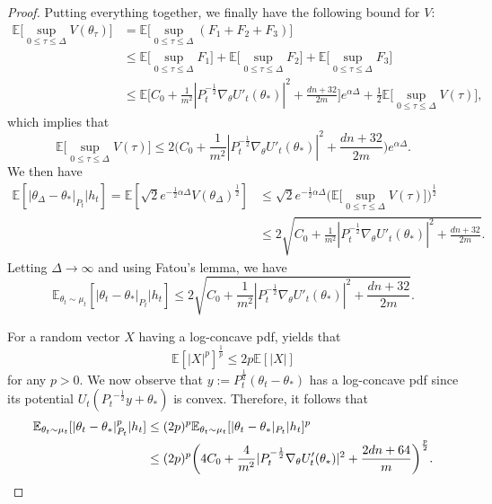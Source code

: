 \documentclass[11pt]{article}
\theoremstyle{plain}
\theoremstyle{definition}
\theoremstyle{remark}
\begin{document}
\begin{proof}
Putting everything together, we finally have the following bound for $V$:
\begin{equation}\label{sup_v}
\begin{split}
\mathbb{E}\bigg[\sup_{0 \leq \tau \leq \Delta} V(\theta_\tau) \bigg]&=\mathbb{E}\bigg[\sup_{0 \leq \tau \leq \Delta}(F_1+F_2+F_3) \bigg]\\
& \leq \mathbb{E}\bigg[\sup_{0 \leq \tau \leq \Delta}F_1\bigg]+\mathbb{E}\bigg[\sup_{0 \leq \tau \leq \Delta}F_2\bigg]+\mathbb{E}\bigg[\sup_{0 \leq \tau \leq \Delta}F_3\bigg]\\
& \leq \mathbb{E}\bigg[C_0+\frac{1}{m^2}|P_t^{-\frac{1}{2}}\nabla_{\theta} U'_t(\theta_*)|^2 + \frac{dn+32}{2m} \bigg]e^{\alpha \Delta} + \frac{1}{2}\mathbb{E}\bigg[\sup_{0 \leq \tau \leq \Delta}V(\tau)\bigg],
\end{split}
\end{equation}
which implies that
\[
\mathbb{E}\bigg[\sup_{0 \leq \tau \leq \Delta} V(\tau) \bigg] \leq
2\bigg(C_0+\frac{1}{m^2}|P_t^{-\frac{1}{2}}\nabla_{\theta} U'_t(\theta_*)|^2 + \frac{dn+32}{2m} \bigg)e^{\alpha \Delta}.
\]
We then have
\begin{equation*}
\begin{split}
    \mathbb{E}[|\theta_{\Delta}-\theta_*|_{P_t}|h_t]  = \mathbb{E}[\sqrt{2}e^{-\frac{1}{2}\alpha \Delta}V(\theta_{\Delta})^{\frac{1}{2}}]
    & \leq \sqrt{2} e^{-\frac{1}{2}\alpha \Delta} \bigg(\mathbb{E}\Big [\sup_{0\leq \tau \leq \Delta}V(\tau) \Big ]\bigg)^{\frac{1}{2}}\\
    & \leq 2\sqrt{C_0+\frac{1}{m^2}|P_t^{-\frac{1}{2}}\nabla_{\theta} U'_t(\theta_*)|^2 + \frac{dn+32}{2m}}.
\end{split}
\end{equation*}
Letting $\Delta \to \infty$ and using Fatou's lemma, we have
\[
\mathbb{E}_{\theta_t \sim \mu_t}[|\theta_t-\theta_*|_{P_t}|h_t] \leq
2\sqrt{C_0+\frac{1}{m^2}|P_t^{-\frac{1}{2}}\nabla_{\theta} U'_t(\theta_*)|^2 + \frac{dn+32}{2m}}.
\]

For a random vector $X$ having a log-concave pdf,
 \cite[Theorem 5.22]{lovasz2003logconcave} yields that
\[
\mathbb{E}[|X|^p]^{\frac{1}{p}} \leq 2p \mathbb{E}[|X|]
\]
for any $p>0$.
We now observe that $y:=P_t^{\frac{1}{2}}(\theta_t-\theta_*)$ has a log-concave pdf since its potential $U_t({P_t}^{-\frac{1}{2}} y +\theta_*)$ is convex. 
Therefore, it follows that
\begin{align}
    \mathbb{E}_{\theta_t \sim \mu_t}[|\theta_t-\theta_*|^p_{P_t}|h_t]&\leq (2p)^p\mathbb{E}_{\theta_t \sim \mu_t}[|\theta_t-\theta_*|_{P_t}|h_t]^p \notag \\
    &\leq (2p)^p\bigg(4C_0+\frac{4}{m^2}|P_t^{-\frac{1}{2}}\nabla_{\theta} U'_t(\theta_*)|^2 + \frac{2dn+64}{m}\bigg)^{\frac{p}{2}} \label{half_1}.
\end{align}


\end{proof}
\end{document}
